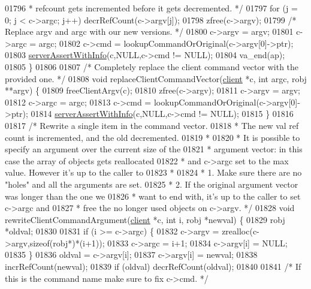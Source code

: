 \begin{DoxyCode}
{{{{{{{{{{{{{{{{{{{{01796 \textcolor{comment}{     * refcount gets incremented before it gets decremented. */}
01797     \textcolor{keywordflow}{for} (j = 0; j < c->argc; j++) decrRefCount(c->argv[j]);
01798     zfree(c->argv);
01799     \textcolor{comment}{/* Replace argv and argc with our new versions. */}
01800     c->argv = argv;
01801     c->argc = argc;
01802     c->cmd = lookupCommandOrOriginal(c->argv[0]->ptr);
01803     \hyperlink{server_8h_a7308f76cbff9a8d3797fe78190b91282}{serverAssertWithInfo}(c,NULL,c->cmd != NULL);
01804     va\_end(ap);
01805 \}
01806 
01807 \textcolor{comment}{/* Completely replace the client command vector with the provided one. */}
01808 \textcolor{keywordtype}{void} replaceClientCommandVector(\hyperlink{structclient}{client} *c, \textcolor{keywordtype}{int} argc, robj **argv) \{
01809     freeClientArgv(c);
01810     zfree(c->argv);
01811     c->argv = argv;
01812     c->argc = argc;
01813     c->cmd = lookupCommandOrOriginal(c->argv[0]->ptr);
01814     \hyperlink{server_8h_a7308f76cbff9a8d3797fe78190b91282}{serverAssertWithInfo}(c,NULL,c->cmd != NULL);
01815 \}
01816 
01817 \textcolor{comment}{/* Rewrite a single item in the command vector.}
01818 \textcolor{comment}{ * The new val ref count is incremented, and the old decremented.}
01819 \textcolor{comment}{ *}
01820 \textcolor{comment}{ * It is possible to specify an argument over the current size of the}
01821 \textcolor{comment}{ * argument vector: in this case the array of objects gets reallocated}
01822 \textcolor{comment}{ * and c->argc set to the max value. However it's up to the caller to}
01823 \textcolor{comment}{ *}
01824 \textcolor{comment}{ * 1. Make sure there are no "holes" and all the arguments are set.}
01825 \textcolor{comment}{ * 2. If the original argument vector was longer than the one we}
01826 \textcolor{comment}{ *    want to end with, it's up to the caller to set c->argc and}
01827 \textcolor{comment}{ *    free the no longer used objects on c->argv. */}
01828 \textcolor{keywordtype}{void} rewriteClientCommandArgument(\hyperlink{structclient}{client} *c, \textcolor{keywordtype}{int} i, robj *newval) \{
01829     robj *oldval;
01830 
01831     \textcolor{keywordflow}{if} (i >= c->argc) \{
01832         c->argv = zrealloc(c->argv,\textcolor{keyword}{sizeof}(robj*)*(i+1));
01833         c->argc = i+1;
01834         c->argv[i] = NULL;
01835     \}
01836     oldval = c->argv[i];
01837     c->argv[i] = newval;
01838     incrRefCount(newval);
01839     \textcolor{keywordflow}{if} (oldval) decrRefCount(oldval);
01840 
01841     \textcolor{comment}{/* If this is the command name make sure to fix c->cmd. */}
}}}}}}}}}}}}}}}}}}}}
\end{DoxyCode}
